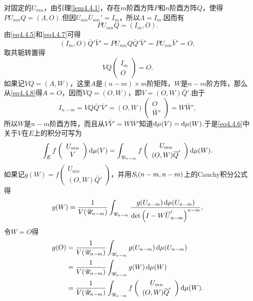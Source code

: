 对固定的$U_{mn}$，由引理\ref{lem4.4.1}，存在$m$阶酉方阵$P$和$n$阶酉方阵$Q$，使得$PU_{mn}Q=(\Lambda,O)$.但因$U_{mn}\bar{U}_{mn}'=I_m$，所以$\Lambda=I_m$.因而有
\begin{equation}\label{eq4.4.7}
	PU_{mn}Q=(I_{m},O).
\end{equation}
由\eqref{eq4.4.5}和\eqref{eq4.4.7}可得
\[(I_m,O)\bar{Q}'\bar{V}'=PU_{mn}Q\bar{Q}'\bar{V}'=PU_{mn}\bar{V}'=O,\]
取共轭转置得
\begin{equation}\label{eq4.4.8}
	VQ\left(\begin{array}{c}
		I_{m}\\
		O
	\end{array}\right)=O.
\end{equation}
如果记$VQ=(A,W)$，这里$A$是$(n-m)\times m$阶矩阵，$W$是$n-m$阶方阵，那么从\eqref{eq4.4.8}得$A=O$，因而$VQ=(O,W)$，即$V=(O,W)\bar{Q}'$.由于
\[I_{n-m}=VQ\bar{Q}'\bar{V}'=(O,W)\left(\begin{array}{c}
	O\\
	\bar{W}'
\end{array}\right)=W\bar{W}',\]
所以$W$是$n-m$阶酉方阵，而且从$V\bar{V}'=W\bar{W}'$知道$\mathop{}\!\mathrm{d}\mu(V)=\mathop{}\!\mathrm{d}\mu(W)$.于是\eqref{eq4.4.6}中关于$V$在$E$上的积分可写为
\begin{equation}\label{eq4.4.9}
	\int_E f\left(\begin{array}{c}
		U_{mn}\\
		V
	\end{array}\right)\mathop{}\!\mathrm{d}\mu(V)=\int_{\mathscr{U}_{n-m}}f\left(\begin{array}{c}
	U_{mn}\\
	(O,W){}\mkern1mu\overline{\mkern-1muQ}'
\end{array}\right)\mathop{}\!\mathrm{d}\mu(W).
\end{equation}
如果记$g(W)=f\left(\begin{array}{c}
	U_{mn}\\
	(O,W)\bar{Q}'
\end{array}\right)$，并用$S_{\text{\uppercase\expandafter{\romannumeral1}}}(n-m,n-m)$上的Cauchy积分公式得
\[g(W)=\frac1{V(\mathscr{U}_{n-m})}\int_{\mathscr{U}_{n-m}}\frac{g(U_{n-m})\mathop{}\!\mathrm{d}\mu(U_{n-m})}{\det\left(I-W{}\mkern1mu\overline{\mkern-1muU}_{n-m}'\right)^{n-m}},\]
令$W=O$得
\begin{align}\label{eq4.4.10}
	g(O)
	&=\frac1{V(\mathscr{U}_{n-m})}\int_{\mathscr{U}_{n-m}} g(U_{n-m})\mathop{}\!\mathrm{d}\mu(U_{n-m})\notag\\
	&=\frac1{V(\mathscr{U}_{n-m})}\int_{\mathscr{U}_{n-m}} g(W)\mathop{}\!\mathrm{d}\mu(W)\notag\\
	&=\frac1{V(\mathscr{U}_{n-m})}\int_{\mathscr{U}_{n-m}}f\left(\begin{array}{c}
		U_{mn}\\
		(O,W){}\mkern1mu\overline{\mkern-1muQ}'
	\end{array}\right)\mathop{}\!\mathrm{d}\mu(W).
\end{align}
